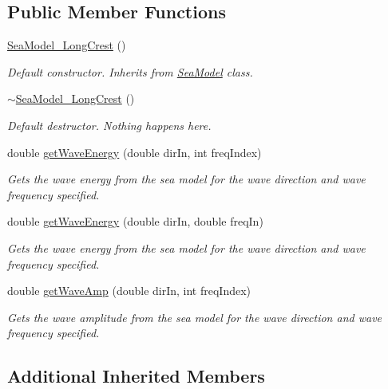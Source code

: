 \subsection*{Public Member Functions}
\begin{DoxyCompactItemize}
\item 
\hyperlink{classosea_1_1_sea_model___long_crest_a0fd446078a88eeda060780cc80e169e4}{Sea\-Model\-\_\-\-Long\-Crest} ()
\begin{DoxyCompactList}\small\item\em Default constructor. Inherits from \hyperlink{classosea_1_1_sea_model}{Sea\-Model} class. \end{DoxyCompactList}\item 
\hyperlink{classosea_1_1_sea_model___long_crest_aa27f39a9e6db096e8e84dd08b1c77cdf}{$\sim$\-Sea\-Model\-\_\-\-Long\-Crest} ()
\begin{DoxyCompactList}\small\item\em Default destructor. Nothing happens here. \end{DoxyCompactList}\item 
double \hyperlink{classosea_1_1_sea_model___long_crest_a269bb4cf5966b2b88195c2cb57b750bc}{get\-Wave\-Energy} (double dir\-In, int freq\-Index)
\begin{DoxyCompactList}\small\item\em Gets the wave energy from the sea model for the wave direction and wave frequency specified. \end{DoxyCompactList}\item 
double \hyperlink{classosea_1_1_sea_model___long_crest_a293fc13033349b9182c6dda3ce8cfe1f}{get\-Wave\-Energy} (double dir\-In, double freq\-In)
\begin{DoxyCompactList}\small\item\em Gets the wave energy from the sea model for the wave direction and wave frequency specified. \end{DoxyCompactList}\item 
double \hyperlink{classosea_1_1_sea_model___long_crest_af29f51ef0ab3edde6c944c0afe13bb51}{get\-Wave\-Amp} (double dir\-In, int freq\-Index)
\begin{DoxyCompactList}\small\item\em Gets the wave amplitude from the sea model for the wave direction and wave frequency specified. \end{DoxyCompactList}\end{DoxyCompactItemize}
\subsection*{Additional Inherited Members}


